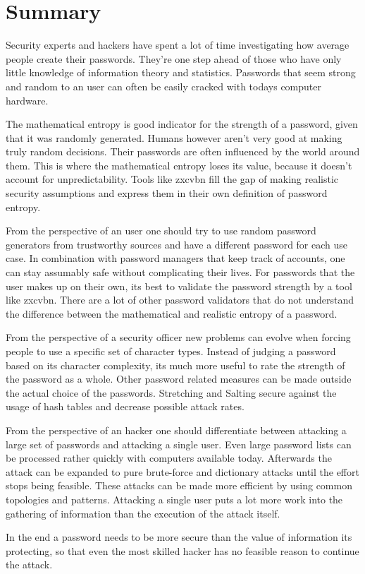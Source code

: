 \section{Summary}

Security experts and hackers have spent a lot of time investigating how average people create their passwords. They're one step ahead of those who have only little knowledge of information theory and statistics. Passwords that seem strong and random to an user can often be easily cracked with todays computer hardware.

The mathematical entropy is good indicator for the strength of a password, given that it was randomly generated. Humans however aren't very good at making truly random decisions. Their passwords are often influenced by the world around them. This is where the mathematical entropy loses its value, because it doesn't account for unpredictability. Tools like zxcvbn fill the gap of making realistic security assumptions and express them in their own definition of password entropy.

From the perspective of an user one should try to use random password generators from trustworthy sources and have a different password for each use case. In combination with password managers that keep track of accounts, one can stay assumably safe without complicating their lives. For passwords that the user makes up on their own, its best to validate the password strength by a tool like zxcvbn. There are a lot of other password validators that do not understand the difference between the mathematical and realistic entropy of a password.

From the perspective of a security officer new problems can evolve when forcing people to use a specific set of character types. Instead of judging a password based on its character complexity, its much more useful to rate the strength of the password as a whole. Other password related measures can be made outside the actual choice of the passwords. Stretching and Salting secure against the usage of hash tables and decrease possible attack rates.

From the perspective of an hacker one should differentiate between attacking a large set of passwords and attacking a single user. Even large password lists can be processed rather quickly with computers available today. Afterwards the attack can be expanded to pure brute-force and dictionary attacks until the effort stops being feasible. These attacks can be made more efficient by using common topologies and patterns. Attacking a single user puts a lot more work into the gathering of information than the execution of the attack itself.

In the end a password needs to be more secure than the value of information its protecting, so that even the most skilled hacker has no feasible reason to continue the attack.

\newpage